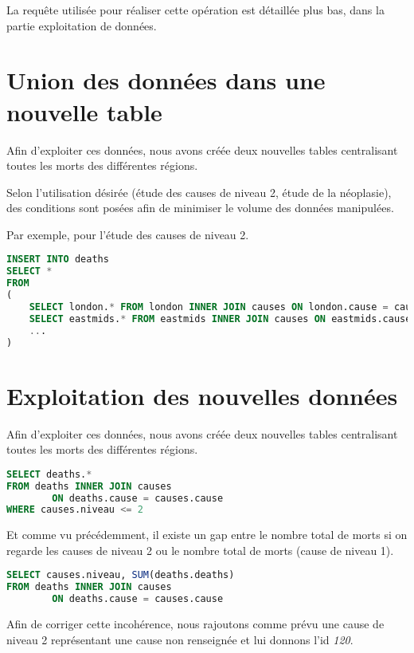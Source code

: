     La requête utilisée pour réaliser cette opération est détaillée plus bas, dans la partie exploitation de données.

\section{Union des données dans une nouvelle table}

    Afin d'exploiter ces données, nous avons créée deux nouvelles tables centralisant toutes les morts des différentes régions.

    Selon l'utilisation désirée (étude des causes de niveau 2, étude de la néoplasie), des conditions sont posées afin
    de minimiser le volume des données manipulées.

    Par exemple, pour l'étude des causes de niveau 2.

    \begin{lstlisting}[frame=single, language=SQL]
INSERT INTO deaths
SELECT *
FROM
(
    SELECT london.* FROM london INNER JOIN causes ON london.cause = causes.cause WHERE causes.niveau <= 2 UNION
    SELECT eastmids.* FROM eastmids INNER JOIN causes ON eastmids.cause = causes.cause WHERE causes.niveau <= 2 UNION
    ...
)
    \end{lstlisting}


\section{Exploitation des nouvelles données}

    Afin d'exploiter ces données, nous avons créée deux nouvelles tables centralisant toutes les morts des différentes régions.

    \begin{lstlisting}[frame=single, language=SQL]
SELECT deaths.*
FROM deaths INNER JOIN causes
        ON deaths.cause = causes.cause
WHERE causes.niveau <= 2
    \end{lstlisting}

    Et comme vu précédemment, il existe un gap entre le nombre total de morts si on regarde les causes de niveau 2 ou le nombre
    total de morts (cause de niveau 1).

    \begin{lstlisting}[frame=single, language=SQL]
SELECT causes.niveau, SUM(deaths.deaths)
FROM deaths INNER JOIN causes
        ON deaths.cause = causes.cause
    \end{lstlisting}


    Afin de corriger cette incohérence, nous rajoutons comme prévu une cause de niveau 2 représentant une cause non renseignée
    et lui donnons l'id \textit{120}.

